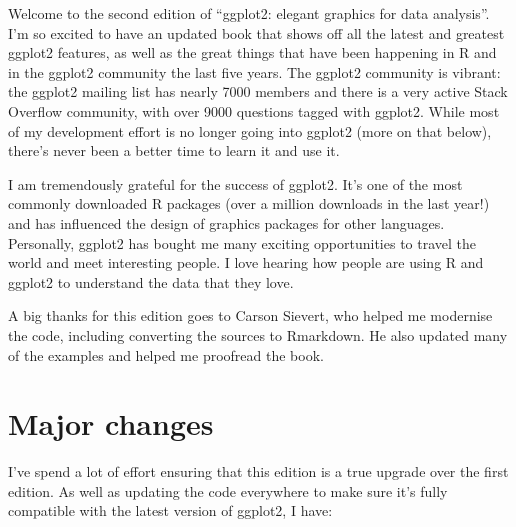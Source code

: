 \preface

Welcome to the second edition of ``ggplot2: elegant graphics for data
analysis''. I'm so excited to have an updated book that shows off all
the latest and greatest ggplot2 features, as well as the great things
that have been happening in R and in the ggplot2 community the last five
years. The ggplot2 community is vibrant: the ggplot2 mailing list has
nearly 7000 members and there is a very active Stack Overflow community,
with over 9000 questions tagged with ggplot2. While most of my
development effort is no longer going into ggplot2 (more on that below),
there's never been a better time to learn it and use it.

I am tremendously grateful for the success of ggplot2. It's one of the
most commonly downloaded R packages (over a million downloads in the
last year!) and has influenced the design of graphics packages for other
languages. Personally, ggplot2 has bought me many exciting opportunities
to travel the world and meet interesting people. I love hearing how
people are using R and ggplot2 to understand the data that they love.

A big thanks for this edition goes to Carson Sievert, who helped me
modernise the code, including converting the sources to Rmarkdown. He
also updated many of the examples and helped me proofread the book.

\section*{Major changes}

I've spend a lot of effort ensuring that this edition is a true upgrade
over the first edition. As well as updating the code everywhere to make
sure it's fully compatible with the latest version of ggplot2, I have:

